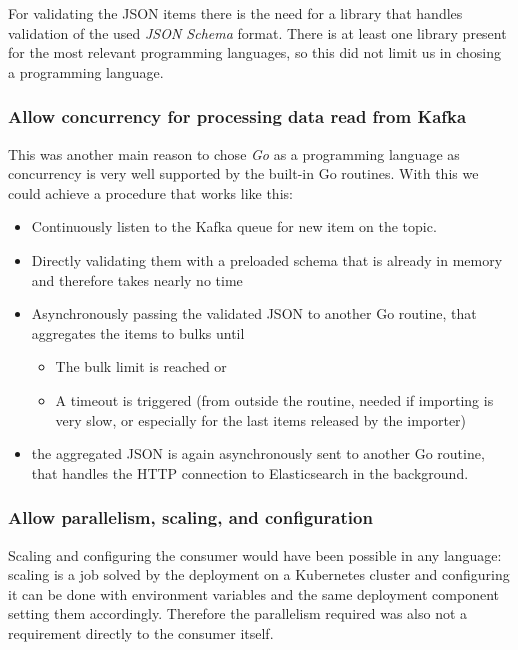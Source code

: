 For validating the JSON items there is the need for a library that
handles validation of the used \emph{JSON Schema} format. There is at
least one library present for the most relevant programming languages,
so this did not limit us in chosing a programming language.

\subsubsection{Allow concurrency for processing data read from
Kafka}\label{allow-concurrency-for-processing-data-read-from-kafka}

This was another main reason to chose \emph{Go} as a programming
language as concurrency is very well supported by the built-in Go
routines. With this we could achieve a procedure that works like this:

\begin{itemize}
\tightlist
\item
  Continuously listen to the Kafka queue for new item on the topic.
\item
  Directly validating them with a preloaded schema that is already in
  memory and therefore takes nearly no time
\item
  Asynchronously passing the validated JSON to another Go routine, that
  aggregates the items to bulks until

  \begin{itemize}
  \tightlist
  \item
    The bulk limit is reached or
  \item
    A timeout is triggered (from outside the routine, needed if
    importing is very slow, or especially for the last items released by
    the importer)
  \end{itemize}
\item
  the aggregated JSON is again asynchronously sent to another Go
  routine, that handles the HTTP connection to Elasticsearch in the
  background.
\end{itemize}

\subsubsection{Allow parallelism, scaling, and
configuration}\label{allow-parallelism-scaling-and-configuration}

Scaling and configuring the consumer would have been possible in any
language: scaling is a job solved by the deployment on a Kubernetes
cluster and configuring it can be done with environment variables and
the same deployment component setting them accordingly. Therefore the
parallelism required was also not a requirement directly to the consumer
itself.


